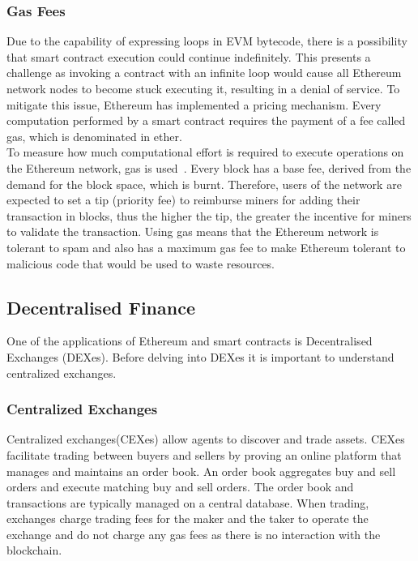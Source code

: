 \subsubsection{Gas Fees}
Due to the capability of expressing loops in EVM bytecode, there is a possibility that smart contract execution could continue indefinitely. This presents a challenge as invoking a contract with an infinite loop would cause all Ethereum network nodes to become stuck executing it, resulting in a denial of service. To mitigate this issue, Ethereum has implemented a pricing mechanism. Every computation performed by a smart contract requires the payment of a fee called gas, which is denominated in ether.
\\[5mm]
To measure how much computational effort is required to execute operations on the Ethereum network, gas is used~\cite{noauthor_gas_nodate}. Every block has a base fee, derived from the demand for the block space, which is burnt. Therefore, users of the network are expected to set a tip (priority fee) to reimburse miners for adding their transaction in blocks, thus the higher the tip, the greater the incentive for miners to validate the transaction. Using gas means that the Ethereum network is tolerant to spam and also has a maximum gas fee to make Ethereum tolerant to malicious code that would be used to waste resources.

\subsection{Decentralised Finance}
One of the applications of Ethereum and smart contracts is Decentralised Exchanges (DEXes). Before delving into DEXes it is important to understand centralized exchanges.

\subsubsection{Centralized Exchanges}
Centralized exchanges(CEXes) allow agents to discover and trade assets. CEXes facilitate trading between buyers and sellers by proving an online platform that manages and maintains an order book. An order book aggregates buy and sell orders and execute matching buy and sell orders. The order book and transactions are typically managed on a central database. When trading, exchanges charge trading fees for the maker and the taker to operate the exchange and do not charge any gas fees as there is no interaction with the blockchain. 

